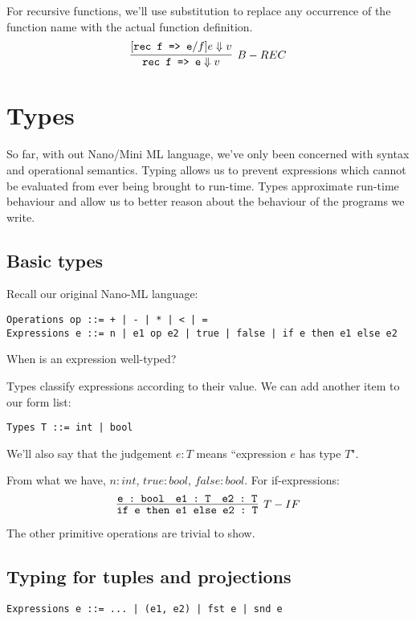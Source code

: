 \documentclass[11pt]{article}
\begin{document}
For recursive functions, we'll use substitution to replace any occurrence of the function name with the actual function definition.
\[
    \infer[B-REC]{\verb~rec f => e~ \Downarrow v}{
        [\verb~rec f => e~ / f] e \Downarrow v
    }
\]

\section{Types}

So far, with out Nano/Mini ML language, we've only been concerned with syntax and operational semantics. Typing allows us to prevent expressions which cannot be evaluated from ever being brought to run-time. Types approximate run-time behaviour and allow us to better reason about the behaviour of the programs we write. 

\subsection{Basic types}

Recall our original Nano-ML language:
\begin{verbatim}
Operations op ::= + | - | * | < | =
Expressions e ::= n | e1 op e2 | true | false | if e then e1 else e2
\end{verbatim}

When is an expression well-typed? 

Types classify expressions according to their value. We can add another item to our form list:
\begin{verbatim}
Types T ::= int | bool
\end{verbatim}

We'll also say that the judgement $e : T$ means ``expression $e$ has type $T$". 

From what we have, $n : int$, $true : bool$, $false : bool$. For if-expressions:
\[
    \infer[T-IF]{\verb~if e then e1 else e2 : T~}{
        \verb~e : bool~
        &
        \verb~e1 : T~
        &
        \verb~e2 : T~
     }
\]

The other primitive operations are trivial to show.

\subsection{Typing for tuples and projections}
\begin{verbatim}
Expressions e ::= ... | (e1, e2) | fst e | snd e
\end{verbatim}
\end{document}
